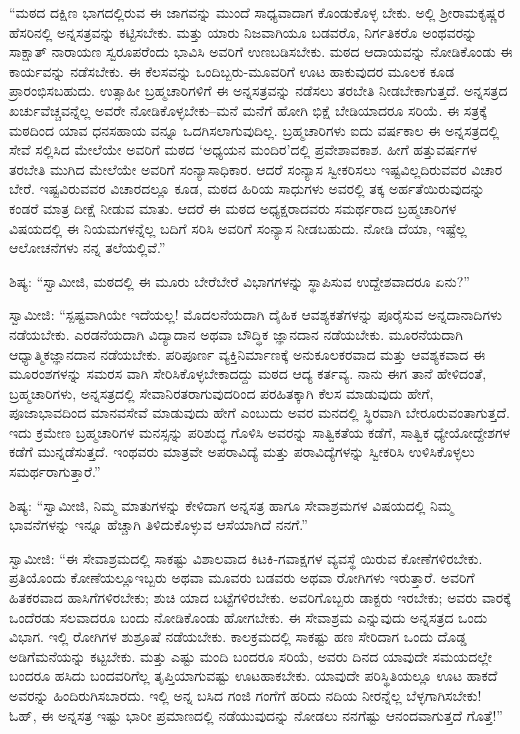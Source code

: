 “ಮಠದ ದಕ್ಷಿಣ ಭಾಗದಲ್ಲಿರುವ ಈ ಜಾಗವನ್ನು ಮುಂದೆ ಸಾಧ್ಯವಾದಾಗ ಕೊಂಡುಕೊಳ್ಳ ಬೇಕು. ಅಲ್ಲಿ ಶ್ರೀರಾಮಕೃಷ್ಣರ ಹೆಸರಿನಲ್ಲಿ ಅನ್ನಸತ್ರವನ್ನು ಕಟ್ಟಿಸಬೇಕು. ಮತ್ತು ಯಾರು ನಿಜವಾಗಿಯೂ ಬಡವರೊ, ನಿರ್ಗತಿಕರೊ ಅಂಥವರನ್ನು ಸಾಕ್ಷಾತ್ ನಾರಾಯಣ ಸ್ವರೂಪರೆಂದು ಭಾವಿಸಿ ಅವರಿಗೆ ಉಣಬಡಿಸಬೇಕು. ಮಠದ ಆದಾಯವನ್ನು ನೋಡಿಕೊಂಡು ಈ ಕಾರ್ಯವನ್ನು ನಡೆಸಬೇಕು. ಈ ಕೆಲಸವನ್ನು ಒಂದಿಬ್ಬರು-ಮೂವರಿಗೆ ಊಟ ಹಾಕುವುದರ ಮೂಲಕ ಕೂಡ ಪ್ರಾರಂಭಿಸಬಹುದು. ಉತ್ಸಾಹೀ ಬ್ರಹ್ಮಚಾರಿಗಳಿಗೆ ಈ ಅನ್ನಸತ್ರವನ್ನು ನಡೆಸಲು ತರಬೇತಿ ನೀಡಬೇಕಾಗುತ್ತದೆ. ಅನ್ನಸತ್ರದ ಖರ್ಚುವೆಚ್ಚವನ್ನೆಲ್ಲ ಅವರೇ ನೋಡಿಕೊಳ್ಳಬೇಕು–ಮನೆ ಮನೆಗೆ ಹೋಗಿ ಭಿಕ್ಷೆ ಬೇಡಿಯಾದರೂ ಸರಿಯೆ. ಈ ಸತ್ರಕ್ಕೆ ಮಠದಿಂದ ಯಾವ ಧನಸಹಾಯ ವನ್ನೂ ಒದಗಿಸಲಾಗುವುದಿಲ್ಲ. ಬ್ರಹ್ಮಚಾರಿಗಳು ಐದು ವರ್ಷಕಾಲ ಈ ಅನ್ನಸತ್ರದಲ್ಲಿ ಸೇವೆ ಸಲ್ಲಿಸಿದ ಮೇಲೆಯೇ ಅವರಿಗೆ ಮಠದ ‘ಅಧ್ಯಯನ ಮಂದಿರ’ದಲ್ಲಿ ಪ್ರವೇಶಾವಕಾಶ. ಹೀಗೆ ಹತ್ತುವರ್ಷಗಳ ತರಬೇತಿ ಮುಗಿದ ಮೇಲೆಯೇ ಅವರಿಗೆ ಸಂನ್ಯಾಸಾಧಿಕಾರ. ಆದರೆ ಸಂನ್ಯಾಸ ಸ್ವೀಕರಿಸಲು ಇಷ್ಟವಿಲ್ಲದಿರುವವರ ವಿಚಾರ ಬೇರೆ. ಇಷ್ಟವಿರುವವರ ವಿಚಾರದಲ್ಲೂ ಕೂಡ, ಮಠದ ಹಿರಿಯ ಸಾಧುಗಳು ಅವರಲ್ಲಿ ತಕ್ಕ ಅರ್ಹತೆಯಿರುವುದನ್ನು ಕಂಡರೆ ಮಾತ್ರ ದೀಕ್ಷೆ ನೀಡುವ ಮಾತು. ಆದರೆ ಈ ಮಠದ ಅಧ್ಯಕ್ಷರಾದವರು ಸಮರ್ಥರಾದ ಬ್ರಹ್ಮಚಾರಿಗಳ ವಿಷಯದಲ್ಲಿ ಈ ನಿಯಮಗಳನ್ನೆಲ್ಲ ಬದಿಗೆ ಸರಿಸಿ ಅವರಿಗೆ ಸಂನ್ಯಾಸ ನೀಡಬಹುದು. ನೋಡಿ ದೆಯಾ, ಇಷ್ಟೆಲ್ಲ ಆಲೋಚನೆಗಳು ನನ್ನ ತಲೆಯಲ್ಲಿವೆ.”

ಶಿಷ್ಯ: “ಸ್ವಾಮೀಜಿ, ಮಠದಲ್ಲಿ ಈ ಮೂರು ಬೇರೆಬೇರೆ ವಿಭಾಗಗಳನ್ನು ಸ್ಥಾಪಿಸುವ ಉದ್ದೇಶವಾದರೂ ಏನು?”

ಸ್ವಾಮೀಜಿ: “ಸ್ಪಷ್ಟವಾಗಿಯೇ ಇದೆಯಲ್ಲ! ಮೊದಲನೆಯದಾಗಿ ದೈಹಿಕ ಆವಶ್ಯಕತೆಗಳನ್ನು ಪೂರೈಸುವ ಅನ್ನದಾನಾದಿಗಳು ನಡೆಯಬೇಕು. ಎರಡನೆಯದಾಗಿ ವಿದ್ಯಾದಾನ ಅಥವಾ ಬೌದ್ಧಿಕ ಜ್ಞಾನದಾನ ನಡೆಯಬೇಕು. ಮೂರನೆಯದಾಗಿ ಆಧ್ಯಾತ್ಮಿಕಜ್ಞಾನದಾನ ನಡೆಯಬೇಕು. ಪರಿಪೂರ್ಣ ವ್ಯಕ್ತಿನಿರ್ಮಾಣಕ್ಕೆ ಅನುಕೂಲಕರವಾದ ಮತ್ತು ಆವಶ್ಯಕವಾದ ಈ ಮೂರಂಶಗಳನ್ನು ಸಮರಸ ವಾಗಿ ಸೇರಿಸಿಕೊಳ್ಳಬೇಕಾದದ್ದು ಮಠದ ಆದ್ಯ ಕರ್ತವ್ಯ. ನಾನು ಈಗ ತಾನೆ ಹೇಳಿದಂತೆ, ಬ್ರಹ್ಮಚಾರಿಗಳು, ಅನ್ನಸತ್ರದಲ್ಲಿ ಸೇವಾನಿರತರಾಗುವುದರಿಂದ ಪರಹಿತಕ್ಕಾಗಿ ಕೆಲಸ ಮಾಡುವುದು ಹೇಗೆ, ಪೂಜಾಭಾವದಿಂದ ಮಾನವಸೇವೆ ಮಾಡುವುದು ಹೇಗೆ ಎಂಬುದು ಅವರ ಮನದಲ್ಲಿ ಸ್ಥಿರವಾಗಿ ಬೇರೂರುವಂತಾಗುತ್ತದೆ. ಇದು ಕ್ರಮೇಣ ಬ್ರಹ್ಮಚಾರಿಗಳ ಮನಸ್ಸನ್ನು ಪರಿಶುದ್ಧ ಗೊಳಿಸಿ ಅವರನ್ನು ಸಾತ್ವಿಕತೆಯ ಕಡೆಗೆ, ಸಾತ್ವಿಕ ಧ್ಯೇಯೋದ್ದೇಶಗಳ ಕಡೆಗೆ ಮುನ್ನಡೆಸುತ್ತದೆ. ಇಂಥವರು ಮಾತ್ರವೇ ಅಪರಾವಿದ್ಯೆ ಮತ್ತು ಪರಾವಿದ್ಯೆಗಳನ್ನು ಸ್ವೀಕರಿಸಿ ಉಳಿಸಿಕೊಳ್ಳಲು ಸಮರ್ಥರಾಗುತ್ತಾರೆ.”

ಶಿಷ್ಯ: “ಸ್ವಾಮೀಜಿ, ನಿಮ್ಮ ಮಾತುಗಳನ್ನು ಕೇಳಿದಾಗ ಅನ್ನಸತ್ರ ಹಾಗೂ ಸೇವಾಶ್ರಮಗಳ ವಿಷಯದಲ್ಲಿ ನಿಮ್ಮ ಭಾವನೆಗಳನ್ನು ಇನ್ನೂ ಹೆಚ್ಚಾಗಿ ತಿಳಿದುಕೊಳ್ಳುವ ಆಸೆಯಾಗಿದೆ ನನಗೆ.”

ಸ್ವಾಮೀಜಿ: “ಈ ಸೇವಾಶ್ರಮದಲ್ಲಿ ಸಾಕಷ್ಟು ವಿಶಾಲವಾದ ಕಿಟಕಿ-ಗವಾಕ್ಷಗಳ ವ್ಯವಸ್ಥೆ ಯಿರುವ ಕೋಣೆಗಳಿರಬೇಕು. ಪ್ರತಿಯೊಂದು ಕೋಣೆಯಲ್ಲೂಇಬ್ಬರು ಅಥವಾ ಮೂವರು ಬಡವರು ಅಥವಾ ರೋಗಿಗಳು ಇರುತ್ತಾರೆ. ಅವರಿಗೆ ಹಿತಕರವಾದ ಹಾಸಿಗೆಗಳಿರಬೇಕು; ಶುಚಿ ಯಾದ ಬಟ್ಟೆಗಳಿರಬೇಕು. ಅವರಿಗೊಬ್ಬರು ಡಾಕ್ಟರು ಇರಬೇಕು; ಅವರು ವಾರಕ್ಕೆ ಒಂದೆರಡು ಸಲವಾದರೂ ಬಂದು ನೋಡಿಕೊಂಡು ಹೋಗಬೇಕು. ಈ ಸೇವಾಶ್ರಮ ಎನ್ನುವುದು ಅನ್ನಸತ್ರದ ಒಂದು ವಿಭಾಗ. ಇಲ್ಲಿ ರೋಗಿಗಳ ಶುಶ್ರೂಷೆ ನಡೆಯಬೇಕು. ಕಾಲಕ್ರಮದಲ್ಲಿ ಸಾಕಷ್ಟು ಹಣ ಸೇರಿದಾಗ ಒಂದು ದೊಡ್ಡ ಅಡಿಗೆಮನೆಯನ್ನು ಕಟ್ಟಬೇಕು. ಮತ್ತು ಎಷ್ಟು ಮಂದಿ ಬಂದರೂ ಸರಿಯೆ, ಅವರು ದಿನದ ಯಾವುದೇ ಸಮಯದಲ್ಲೇ ಬಂದರೂ ಹಸಿದು ಬಂದವರಿಗೆಲ್ಲ ತೃಪ್ತಿಯಾಗುವಷ್ಟು ಊಟಹಾಕಬೇಕು. ಯಾವುದೇ ಪರಿಸ್ಥಿತಿಯಲ್ಲೂ ಊಟ ಹಾಕದೆ ಅವರನ್ನು ಹಿಂದಿರುಗಿಸಬಾರದು. ಇಲ್ಲಿ ಅನ್ನ ಬಸಿದ ಗಂಜಿ ಗಂಗೆಗೆ ಹರಿದು ನದಿಯ ನೀರನ್ನೆಲ್ಲ ಬೆಳ್ಳಗಾಗಿಸಬೇಕು! ಓಹ್, ಈ ಅನ್ನಸತ್ರ ಇಷ್ಟು ಭಾರೀ ಪ್ರಮಾಣದಲ್ಲಿ ನಡೆಯುವುದನ್ನು ನೋಡಲು ನನಗೆಷ್ಟು ಆನಂದವಾಗುತ್ತದೆ ಗೊತ್ತೆ!”

